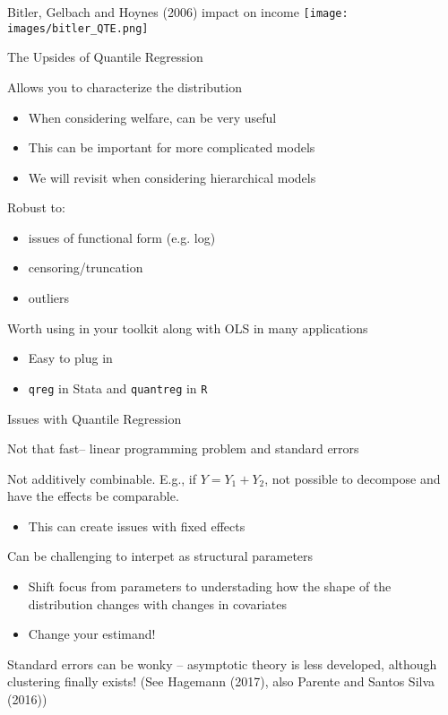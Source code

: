 \documentclass[notes,11pt, aspectratio=169]{beamer}
\newenvironment{wideitemize}{\itemize\addtolength{\itemsep}{10pt}}{\enditemize}
\begin{document}
\begin{frame}{Bitler, Gelbach and Hoynes (2006) impact on income }
    \texttt{[image: images/bitler\_QTE.png]}
\end{frame}


\begin{frame}{The Upsides of Quantile Regression}
  \begin{wideitemize}
  \item Allows you to characterize the distribution
    \begin{itemize}
    \item  When considering welfare, can be very useful
    \item This can be important for more complicated models
    \item We will revisit when considering hierarchical models
    \end{itemize}
  \item Robust to:
    \begin{itemize}
    \item issues of functional form (e.g. log)
    \item censoring/truncation
    \item outliers
    \end{itemize}
  \item Worth using in your toolkit along with OLS in many applications
    \begin{itemize}
    \item Easy to plug in
    \item \texttt{qreg} in Stata and \texttt{quantreg} in \texttt{R}
    \end{itemize}
  \end{wideitemize}
\end{frame}

\begin{frame}{Issues with Quantile Regression}
  \begin{wideitemize}
  \item Not that fast-- linear programming problem and standard errors
  \item Not additively combinable. E.g., if $Y = Y_{1} + Y_{2}$, not
    possible to decompose and have the effects be comparable.
    \begin{itemize}
    \item This can create issues with fixed effects
    \end{itemize}
  \item Can be challenging to interpet as structural parameters
    \begin{itemize}
    \item Shift focus from parameters to understading how the shape of
      the distribution changes with changes in covariates
    \item Change your estimand!
    \end{itemize}
  \item Standard errors can be wonky -- asymptotic theory is less
    developed, although clustering finally exists! (See Hagemann
    (2017), also Parente and Santos Silva (2016))
  \end{wideitemize}
\end{frame}
\end{document}

